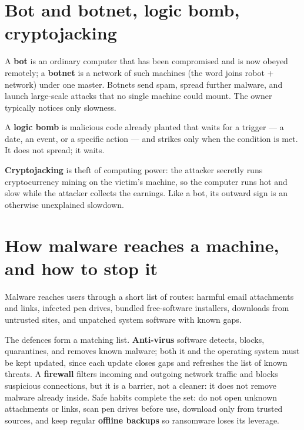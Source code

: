 \documentclass[11pt]{article}
\begin{document}
\section{Bot and botnet, logic bomb, cryptojacking}
A \textbf{bot} is an ordinary computer that has been compromised and is now
obeyed remotely; a \textbf{botnet} is a network of such machines (the word
joins robot + network) under one master. Botnets send spam, spread further
malware, and launch large-scale attacks that no single machine could mount.
The owner typically notices only slowness.

A \textbf{logic bomb} is malicious code already planted that waits for a
trigger --- a date, an event, or a specific action --- and strikes only when
the condition is met. It does not spread; it waits.

\textbf{Cryptojacking} is theft of computing power: the attacker secretly
runs cryptocurrency mining on the victim's machine, so the computer runs hot
and slow while the attacker collects the earnings. Like a bot, its outward
sign is an otherwise unexplained slowdown.

\section{How malware reaches a machine, and how to stop it}
Malware reaches users through a short list of routes: harmful email
attachments and links, infected pen drives, bundled free-software
installers, downloads from untrusted sites, and unpatched system software
with known gaps.

The defences form a matching list. \textbf{Anti-virus} software detects,
blocks, quarantines, and removes known malware; both it and the operating
system must be kept updated, since each update closes gaps and refreshes the
list of known threats. A \textbf{firewall} filters incoming and outgoing
network traffic and blocks suspicious connections, but it is a barrier, not
a cleaner: it does not remove malware already inside. Safe habits complete
the set: do not open unknown attachments or links, scan pen drives before
use, download only from trusted sources, and keep regular \textbf{offline
backups} so ransomware loses its leverage.
\end{document}
